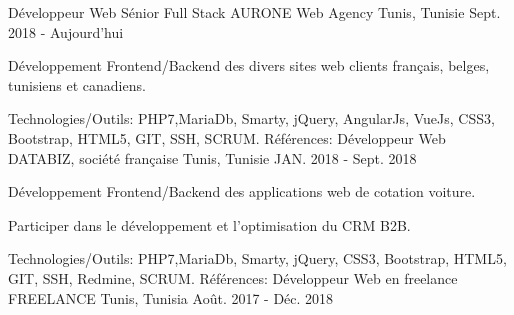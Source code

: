 \begin{cventries}
  \techentries
    {Développeur Web  Sénior Full Stack}
    {AURONE Web Agency}
    {Tunis, Tunisie}
    {Sept. 2018 - Aujourd'hui}
    {
      \begin{cvitems}
        \item {Développement Frontend/Backend des divers sites web clients français, belges, tunisiens et canadiens.}    
      \end{cvitems}
    }
    {\textcolor{awesome}{Technologies/Outils: } {\color{graytext}}  {PHP7,MariaDb, Smarty, jQuery, AngularJs, VueJs, CSS3, Bootstrap, HTML5, GIT, SSH, SCRUM.}}
    {Références:} 
    {
      \href{https://www.beaconsfield.ca/fr/}{} \break
      \href{http://www.advancia-training.com/}{} \break
      \href{https://www.talos.tn/}{} \break
    }
  \techentries
    {Développeur Web}
    {DATABIZ, société française}
    {Tunis, Tunisie}
    {JAN. 2018 - Sept. 2018}
    {
      \begin{cvitems}
		    \item {Développement Frontend/Backend des applications web de cotation voiture.}		
		    \item {Participer dans le développement et l'optimisation du CRM B2B.}
      \end{cvitems}
    }
    {\textcolor{awesome}{Technologies/Outils: } {\color{graytext}}  {PHP7,MariaDb, Smarty, jQuery, CSS3, Bootstrap, HTML5, GIT, SSH, Redmine, SCRUM.}}
    {Références:} 
    {\href{https://www.reprise-citroen.fr/}{} \break
     \href{https://www.reprise-cash-bypeugeot.fr/}{} \break
     \href{https://www.reprise.dsautomobiles.fr/}{}\break
     \href{https://ankaufservice.renault.de/}{}\break
    }
  \techentries
    {Développeur Web en freelance}
    {FREELANCE}
    {Tunis, Tunisia}
    {Août. 2017 - Déc. 2018}

\end{cventries}
